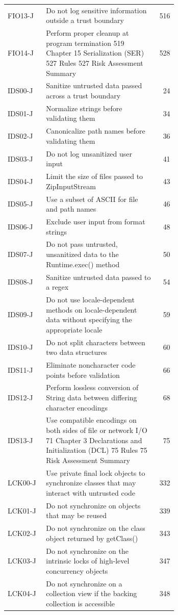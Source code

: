 \documentclass[11pt]{report}
\begin{document}
\begin{longtable}{@{}l>{\raggedright\arraybackslash}p{0.66\linewidth}r@{}}
FIO13-J & Do not log sensitive information outside a trust boundary & 516\\
FIO14-J & Perform proper cleanup at program termination 519 Chapter 15 Serialization (SER) 527 Rules 527 Risk Assessment Summary & 528\\
IDS00-J & Sanitize untrusted data passed across a trust boundary & 24\\
IDS01-J & Normalize strings before validating them & 34\\
IDS02-J & Canonicalize path names before validating them & 36\\
IDS03-J & Do not log unsanitized user input & 41\\
IDS04-J & Limit the size of files passed to ZipInputStream & 43\\
IDS05-J & Use a subset of ASCII for file and path names & 46\\
IDS06-J & Exclude user input from format strings & 48\\
IDS07-J & Do not pass untrusted, unsanitized data to the Runtime.exec() method & 50\\
IDS08-J & Sanitize untrusted data passed to a regex & 54\\
IDS09-J & Do not use locale-dependent methods on locale-dependent data without specifying the appropriate locale & 59\\
IDS10-J & Do not split characters between two data structures & 60\\
IDS11-J & Eliminate noncharacter code points before validation & 66\\
IDS12-J & Perform lossless conversion of String data between differing character encodings & 68\\
IDS13-J & Use compatible encodings on both sides of file or network I/O 71 Chapter 3 Declarations and Initialization (DCL) 75 Rules 75 Risk Assessment Summary & 75\\
LCK00-J & Use private final lock objects to synchronize classes that may interact with untrusted code & 332\\
LCK01-J & Do not synchronize on objects that may be reused & 339\\
LCK02-J & Do not synchronize on the class object returned by getClass() & 343\\
LCK03-J & Do not synchronize on the intrinsic locks of high-level concurrency objects & 347\\
LCK04-J & Do not synchronize on a collection view if the backing collection is accessible & 348\\

\end{longtable}
\end{document}
